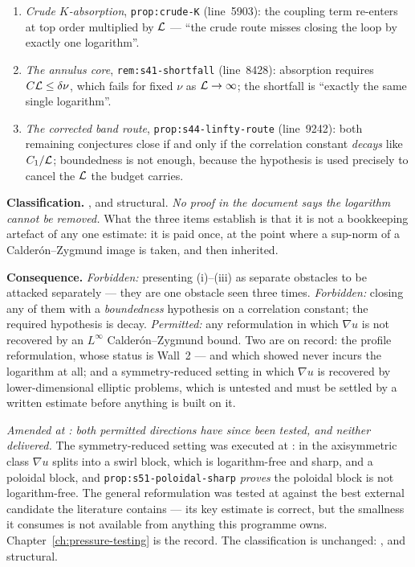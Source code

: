 \begin{enumerate}[label=\textup{(\roman*)},leftmargin=2.4em]
\item \emph{Crude \(K\)-absorption}, \texttt{prop:crude-K} (line~5903): the
  coupling term re-enters at top order multiplied by \(\mathcal{L}\) --- ``the crude
  route misses closing the loop by exactly one logarithm''.
\item \emph{The annulus core}, \texttt{rem:s41-shortfall} (line~8428):
  absorption requires \(C\mathcal{L}\le\delta\nu\), which fails for fixed \(\nu\) as
  \(\mathcal{L}\to\infty\); the shortfall is ``exactly the same single logarithm''.
\item \emph{The corrected band route}, \texttt{prop:s44-linfty-route}
  (line~9242): both remaining conjectures close if and only if the correlation
  constant \emph{decays} like \(C_1/\mathcal{L}\); boundedness is not enough, because
  the hypothesis is used precisely to cancel the \(\mathcal{L}\) the budget carries.
\end{enumerate}

\textbf{Classification.} \OPEN{}, and structural. \emph{No proof in the
document says the logarithm cannot be removed.} What the three items establish
is that it is not a bookkeeping artefact of any one estimate: it is paid once,
at the point where a sup-norm of a Calder\'on--Zygmund image is taken, and then
inherited.

\textbf{Consequence.} \emph{Forbidden:} presenting (i)--(iii) as separate
obstacles to be attacked separately --- they are one obstacle seen three times.
\emph{Forbidden:} closing any of them with a \emph{boundedness} hypothesis on a
correlation constant; the required hypothesis is decay. \emph{Permitted:} any
reformulation in which \(\nabla u\) is not recovered by an \(L^\infty\)
Calder\'on--Zygmund bound. Two are on record: the profile reformulation, whose
status is Wall~2 --- and which  showed never incurs the logarithm at
all; and a symmetry-reduced setting in which \(\nabla u\) is recovered by
lower-dimensional elliptic problems, which is untested and must be settled by a
written estimate before anything is built on it.

\emph{Amended at : both permitted directions have since been tested, and
neither delivered.} The symmetry-reduced setting was executed at : in
the axisymmetric class \(\nabla u\) splits into a swirl block, which is
logarithm-free and sharp, and a poloidal block, and
\texttt{prop:s51-poloidal-sharp} \emph{proves} the poloidal block is not
logarithm-free. The general reformulation was tested at  against the
best external candidate the literature contains --- its key estimate is
correct, but the smallness it consumes is not available from anything this
programme owns. Chapter~\ref{ch:pressure-testing} is the record. The
classification is unchanged: \OPEN{}, and structural.

